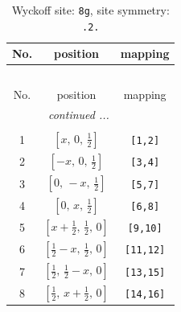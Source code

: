 \documentclass[fleqn,8pt]{jsarticle}
\begin{document}
\renewcommand{\arraystretch}{1.2}
\begin{longtable}{ccc}
\caption{Wyckoff site: {\tt 8g}, site symmetry: {\tt .2.}}
 \\
 \hline \hline
No. & position & mapping \\ \hline \endfirsthead

\multicolumn{2}{l}{\tablename\ \thetable{}} \\
 \hline \hline
No. & position & mapping \\ \hline \endhead

 \hline \hline
\multicolumn{2}{r}{\footnotesize\it continued ...} \\ \endfoot

 \hline \hline
\multicolumn{2}{r}{} \\ \endlastfoot

1 & $\left[ x,\, 0,\, \frac{1}{2} \right]$ & {\tt [1,2]} \\ \hline
2 & $\left[ - x,\, 0,\, \frac{1}{2} \right]$ & {\tt [3,4]} \\ \hline
3 & $\left[ 0,\, - x,\, \frac{1}{2} \right]$ & {\tt [5,7]} \\ \hline
4 & $\left[ 0,\, x,\, \frac{1}{2} \right]$ & {\tt [6,8]} \\ \hline
5 & $\left[ x + \frac{1}{2},\, \frac{1}{2},\, 0 \right]$ & {\tt [9,10]} \\ \hline
6 & $\left[ \frac{1}{2} - x,\, \frac{1}{2},\, 0 \right]$ & {\tt [11,12]} \\ \hline
7 & $\left[ \frac{1}{2},\, \frac{1}{2} - x,\, 0 \right]$ & {\tt [13,15]} \\ \hline
8 & $\left[ \frac{1}{2},\, x + \frac{1}{2},\, 0 \right]$ & {\tt [14,16]} \\
\end{longtable}
\renewcommand{\arraystretch}{1.2}
\end{document}
